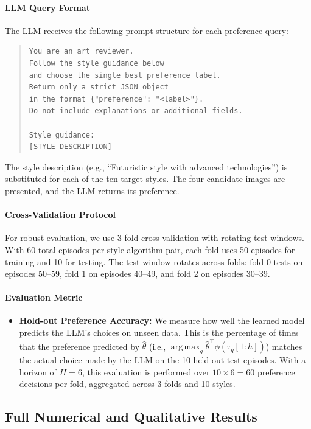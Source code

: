 \documentclass{article}
\DeclareMathOperator*{\argmax}{arg\,max}
\begin{document}
\paragraph{LLM Query Format}
The LLM receives the following prompt structure for each preference query:
\begin{quote}
\small
\begin{verbatim}
You are an art reviewer.
Follow the style guidance below
and choose the single best preference label.
Return only a strict JSON object
in the format {"preference": "<label>"}.
Do not include explanations or additional fields.

Style guidance:
[STYLE DESCRIPTION]
\end{verbatim}
\end{quote}
The style description (e.g., ``Futuristic style with advanced technologies'') is substituted for each of the ten target styles. The four candidate images are presented, and the LLM returns its preference.

\paragraph{Cross-Validation Protocol}
For robust evaluation, we use 3-fold cross-validation with rotating test windows. With 60 total episodes per style-algorithm pair, each fold uses 50 episodes for training and 10 for testing. The test window rotates across folds: fold 0 tests on episodes 50--59, fold 1 on episodes 40--49, and fold 2 on episodes 30--39.

\paragraph{Evaluation Metric}
\begin{itemize}
    \item \textbf{Hold-out Preference Accuracy:} We measure how well the learned model predicts the LLM's choices on unseen data. This is the percentage of times that the preference predicted by $\hat{\theta}$ (i.e., $\argmax_q \hat{\theta}^\top \phi(\tau_q[1:h])$) matches the actual choice made by the LLM on the 10 held-out test episodes. With a horizon of $H=6$, this evaluation is performed over $10 \times 6 = 60$ preference decisions per fold, aggregated across 3 folds and 10 styles.
\end{itemize}

\subsection{Full Numerical and Qualitative Results}
\label{sec:appendix_full_results}
\end{document}
